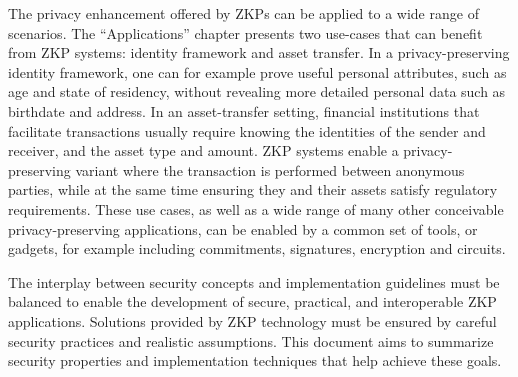 	The privacy enhancement offered by ZKPs can be applied to a wide range of scenarios.  
	The ``Applications'' chapter presents two use-cases that can benefit from ZKP systems: identity framework and asset transfer. 
	In a privacy-preserving identity framework, one can for example prove useful personal attributes, such as age and state of residency, without revealing more detailed personal data such as birthdate and address.
	In an asset-transfer setting, financial institutions that facilitate transactions usually require knowing the identities of the sender and receiver, and the asset type and amount. 
	ZKP systems enable a privacy-preserving variant where the transaction is performed between anonymous parties, while at the same time ensuring they and their assets satisfy regulatory requirements.
	These use cases, as well as a wide range of many other conceivable privacy-preserving applications, can be enabled by a common set of tools, or gadgets, for example including commitments, signatures, encryption and circuits.
\loosen


	The interplay between security concepts and implementation guidelines must be balanced to enable the development of secure, practical, and interoperable ZKP applications.
	Solutions provided by ZKP technology must be ensured by careful security practices and realistic assumptions.
	This document aims to summarize security properties and implementation techniques that help achieve these goals.
		
